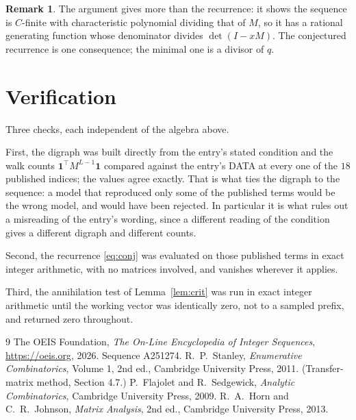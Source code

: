 \documentclass[11pt,a4paper]{article}
\theoremstyle{plain}
\theoremstyle{definition}
\newtheorem{remark}[theorem]{Remark}
\begin{document}
\begin{remark}
The argument gives more than the recurrence: it shows the sequence is $C$-finite with
characteristic polynomial dividing that of $M$, so it has a rational generating function
whose denominator divides $\det(I-xM)$. The conjectured recurrence is one consequence; the
minimal one is a divisor of $q$.
\end{remark}

\section{Verification}

Three checks, each independent of the algebra above.

First, the digraph was built directly from the entry's stated condition and the walk counts
$\mathbf{1}^{\!\top}M^{L-1}\mathbf{1}$ compared against the entry's DATA at
every one of the $18$ published indices; the values agree exactly. That is what ties
the digraph to the sequence: a model that reproduced only some of the published terms would
be the wrong model, and would have been rejected. In particular it is what rules out a
misreading of the entry's wording, since a different reading of the condition gives a
different digraph and different counts.

Second, the recurrence \eqref{eq:conj} was evaluated on those published terms in exact
integer arithmetic, with no matrices involved, and vanishes wherever it applies.

Third, the annihilation test of Lemma~\ref{lem:crit} was run in exact integer arithmetic
until the working vector was identically zero, not to a sampled prefix, and returned zero
throughout.

\begin{thebibliography}{9}
 The OEIS Foundation, \emph{The On-Line Encyclopedia of Integer
Sequences}, \url{https://oeis.org}, 2026. Sequence A251274.
 R.~P.~Stanley, \emph{Enumerative Combinatorics}, Volume 1, 2nd ed.,
Cambridge University Press, 2011. (Transfer-matrix method, Section 4.7.)
 P.~Flajolet and R.~Sedgewick, \emph{Analytic Combinatorics}, Cambridge
University Press, 2009.
 R.~A.~Horn and C.~R.~Johnson, \emph{Matrix Analysis}, 2nd ed., Cambridge
University Press, 2013.
\end{thebibliography}
\end{document}
